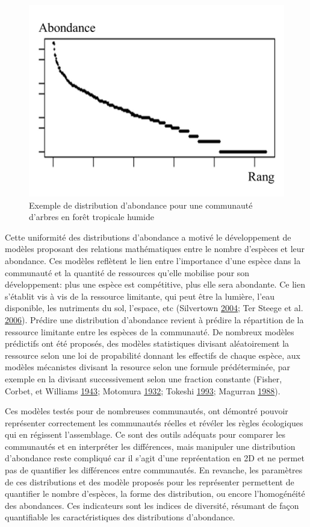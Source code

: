 \documentclass[11pt,french,A4paper,extrafontsizes,onecolumn,openright]{memoir}
\begin{document}
\begin{figure}

{\centering \includegraphics[width=0.6\linewidth]{ExternalFig/SpeciesAbdDist} 

}

\caption{Exemple de distribution d'abondance pour une communauté d'arbres en forêt tropicale humide}\label{fig:AbdDist}
\end{figure}

Cette uniformité des distributions d'abondance a motivé le développement
de modèles proposant des relations mathématiques entre le nombre
d'espèces et leur abondance. Ces modèles reflètent le lien entre
l'importance d'une espèce dans la communauté et la quantité de
ressources qu'elle mobilise pour son développement: plus une espèce est
compétitive, plus elle sera abondante. Ce lien s'établit vis à vis de la
ressource limitante, qui peut être la lumière, l'eau disponible, les
nutriments du sol, l'espace, etc (Silvertown
\protect\hyperlink{ref-Silvertown2004}{2004}; Ter Steege et al.
\protect\hyperlink{ref-terSteege2006}{2006}). Prédire une distribution
d'abondance revient à prédire la répartition de la ressource limitante
entre les espèces de la communauté. De nombreux modèles prédictifs ont
été proposés, des modèles statistiques divisant aléatoirement la
ressource selon une loi de propabilité donnant les effectifs de chaque
espèce, aux modèles mécanistes divisant la resource selon une formule
prédéterminée, par exemple en la divisant successivement selon une
fraction constante (Fisher, Corbet, et Williams
\protect\hyperlink{ref-Fisher1943}{1943}; Motomura
\protect\hyperlink{ref-Motomura1932}{1932}; Tokeshi
\protect\hyperlink{ref-Tokeshi1993}{1993}; Magurran
\protect\hyperlink{ref-Magurran1988}{1988}).

Ces modèles testés pour de nombreuses communautés, ont démontré pouvoir
représenter correctement les communautés réelles et révéler les règles
écologiques qui en régissent l'assemblage. Ce sont des outils adéquats
pour comparer les communautés et en interpréter les différences, mais
manipuler une distribution d'abondance reste compliqué car il s'agit
d'une repréentation en 2D et ne permet pas de quantifier les différences
entre communautés. En revanche, les paramètres de ces distributions et
des modèle proposés pour les représenter permettent de quantifier le
nombre d'espèces, la forme des distribution, ou encore l'homogénéité des
abondances. Ces indicateurs sont les indices de diversité, résumant de
façon quantifiable les caractéristiques des distributions d'abondance.
\end{document}
